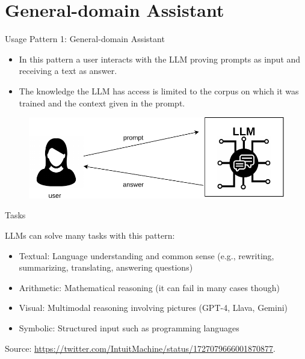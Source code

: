 \documentclass[handout]{beamer}
\begin{document}

\section{General-domain Assistant}

\begin{frame}{Usage Pattern 1: General-domain Assistant}
\begin{scriptsize}
\begin{itemize}
\item In this pattern a user interacts with the LLM proving prompts as input and receiving a text as answer.
\item The knowledge the LLM has access is limited to the corpus on which it was trained and the context given in the prompt.
\end{itemize}

 \begin{figure}[h]
        	\includegraphics[scale = 0.6]{pics/assistantpattern.pdf}
        \end{figure}  


\end{scriptsize}
\end{frame}


\begin{frame}{Tasks}
\begin{scriptsize}
LLMs can solve many tasks with this pattern:

\begin{itemize}
\item Textual: Language understanding and common sense (e.g., rewriting, summarizing, translating, answering questions)
\item Arithmetic: Mathematical reasoning  (it can fail in many cases though)
\item Visual: Multimodal reasoning involving pictures (GPT-4, Llava, Gemini)
\item Symbolic: Structured input such as programming languages
\end{itemize}
Source: \url{https://twitter.com/IntuitMachine/status/1727079666001870877}.
\end{scriptsize}
\end{frame}
\end{document}
